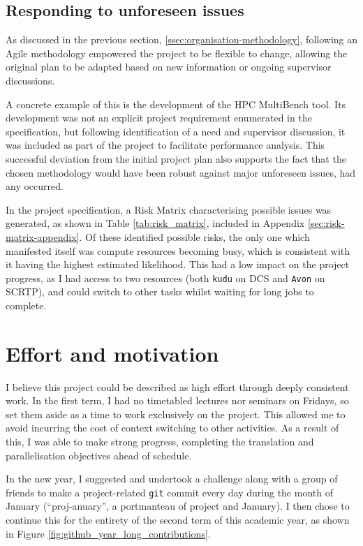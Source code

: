 \subsection{Responding to unforeseen issues}
\label{ssec:organisation-unforeseen-issues}

As discussed in the previous section, \ref{ssec:organisation-methodology}, following an Agile methodology empowered the project to be flexible to change, allowing the original plan to be adapted based on new information or ongoing supervisor discussions.

A concrete example of this is the development of the HPC MultiBench tool. Its development was not an explicit project requirement enumerated in the specification, but following identification of a need and supervisor discussion, it was included as part of the project to facilitate performance analysis. This successful deviation from the initial project plan also supports the fact that the chosen methodology would have been robust against major unforeseen issues, had any occurred.

In the project specification, a Risk Matrix characterising possible issues was generated, as shown in Table \ref{tab:risk_matrix}, included in Appendix \ref{sec:risk-matrix-appendix}. Of these identified possible risks, the only one which manifested itself was compute resources becoming busy, which is consistent with it having the highest estimated likelihood. This had a low impact on the project progress, as I had access to two resources (both \texttt{kudu} on DCS and \texttt{Avon} on SCRTP), and could switch to other tasks whilst waiting for long jobs to complete.

\section{Effort and motivation}
\label{sec:effort-and-motivation}

I believe this project could be described as high effort through deeply consistent work. In the first term, I had no timetabled lectures nor seminars on Fridays, so set them aside as a time to work exclusively on the project. This allowed me to avoid incurring the cost of context switching to other activities. As a result of this, I was able to make strong progress, completing the translation and parallelisation objectives ahead of schedule.

In the new year, I suggested and undertook a challenge along with a group of friends to make a project-related \texttt{git} commit every day during the month of January (``proj-anuary'', a portmanteau of project and January). I then chose to continue this for the entirety of the second term of this academic year, as shown in Figure \ref{fig:github_year_long_contributions}.

